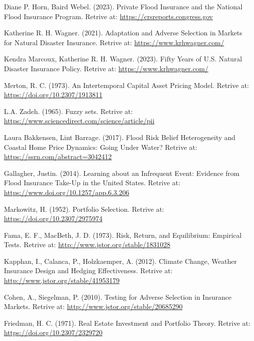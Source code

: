 \documentclass[12pt]{article}  %
\begin{document}
\begin{thebibliography}{99}

 Diane P. Horn, Baird Webel. (2023). Private Flood Insurance and the National Flood Insurance Program. Retrive at: \href{https://crsreports.congress.gov}{https://crsreports.congress.gov}

 Katherine R. H. Wagner. (2021). Adaptation and Adverse Selection in Markets for Natural Disaster Insurance. Retrive at: \href{https://www.krhwagner.com/}{https://www.krhwagner.com/}

 Kendra Marcoux, Katherine R. H. Wagner. (2023). Fifty Years of U.S. Natural Disaster Insurance Policy. Retrive at: \href{https://www.krhwagner.com/}{https://www.krhwagner.com/}

 Merton, R. C. (1973). An Intertemporal Capital Asset Pricing Model. Retrive at: \href{https://doi.org/10.2307/1913811}{https://doi.org/10.2307/1913811}

 L.A. Zadeh. (1965). Fuzzy sets. Retrive at: 
\href{https://www.sciencedirect.com/science/article/pii/S001999586590241X}{https://www.sciencedirect.com/science/article/pii}

 Laura Bakkensen, Lint Barrage. (2017). Flood Risk Belief Heterogeneity and Coastal Home Price Dynamics: Going Under Water? Retrive at: \href{https://ssrn.com/abstract=3042412}{https://ssrn.com/abstract=3042412}

 Gallagher, Justin. (2014). Learning about an Infrequent Event: Evidence from Flood Insurance Take-Up in the United States. Retrive at: \href{https://www.doi.org/10.1257/app.6.3.206}{https://www.doi.org/10.1257/app.6.3.206}

 Markowitz, H. (1952). Portfolio Selection. Retrive at: \href{https://doi.org/10.2307/2975974}{https://doi.org/10.2307/2975974}

 Fama, E. F., MacBeth, J. D. (1973). Risk, Return, and Equilibrium: Empirical Tests. Retrive at: \href{http://www.jstor.org/stable/1831028}{http://www.jstor.org/stable/1831028}

 Kapphan, I., Calanca, P., Holzkaemper, A. (2012). Climate Change, Weather Insurance Design and Hedging Effectiveness. Retrive at: \href{http://www.jstor.org/stable/41953179}{http://www.jstor.org/stable/41953179}

 Cohen, A., Siegelman, P. (2010). Testing for Adverse Selection in Insurance Markets. Retrive at: \href{http://www.jstor.org/stable/20685290}{http://www.jstor.org/stable/20685290}

 Friedman, H. C. (1971). Real Estate Investment and Portfolio Theory. Retrive at: \href{https://doi.org/10.2307/2329720}{https://doi.org/10.2307/2329720}

\end{thebibliography}
\end{document}
